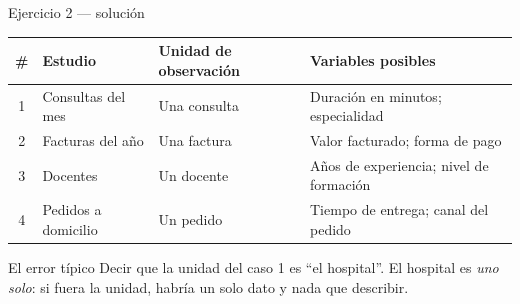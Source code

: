 \documentclass[aspectratio=169,10pt]{beamer}
\begin{document}
\begin{frame}{Ejercicio 2 — solución}
  \scriptsize
  \begin{center}
  \begin{tabular}{@{}clll@{}}
    \toprule
    \textbf{\#} & \textbf{Estudio} & \textbf{Unidad de observación} &
    \textbf{Variables posibles} \\
    \midrule
    1 & Consultas del mes & Una consulta &
      Duración en minutos; especialidad \\
    2 & Facturas del año  & Una factura &
      Valor facturado; forma de pago \\
    3 & Docentes          & Un docente &
      Años de experiencia; nivel de formación \\
    4 & Pedidos a domicilio & Un pedido &
      Tiempo de entrega; canal del pedido \\
    \bottomrule
  \end{tabular}
  \end{center}

  \vspace{0.25cm}
  \begin{alertblock}{El error típico}
    \footnotesize
    Decir que la unidad del caso 1 es ``el hospital''. El hospital es
    \emph{uno solo}: si fuera la unidad, habría un solo dato y nada que
    describir. 
  \end{alertblock}
\end{frame}
\end{document}
